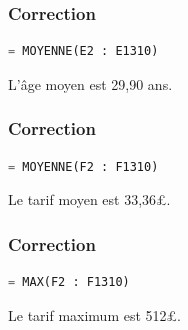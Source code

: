 \documentclass[svgnames,11pt]{beamer}
\begin{document}
\begin{frame}[fragile]
    \frametitle{Correction}

    \begin{center}
    \begin{lstlisting}[language=Python , basicstyle=\small, xleftmargin=2em, xrightmargin=2em]
= MOYENNE(E2 : E1310)
\end{lstlisting}
    \label{age}
    \end{center}
L'âge moyen est 29,90 ans.
\end{frame}
\begin{frame}[fragile]
    \frametitle{Correction}

    \begin{center}
    \begin{lstlisting}[language=Python , basicstyle=\small, xleftmargin=2em, xrightmargin=2em]
= MOYENNE(F2 : F1310)
\end{lstlisting}
    \label{age}
    \end{center}
Le tarif moyen est 33,36£.
\end{frame}
\begin{frame}[fragile]
    \frametitle{Correction}

    \begin{center}
    \begin{lstlisting}[language=Python , basicstyle=\small, xleftmargin=2em, xrightmargin=2em]
= MAX(F2 : F1310)
\end{lstlisting}
    \label{age}
    \end{center}
Le tarif maximum est 512£.
\end{frame}
\end{document}
